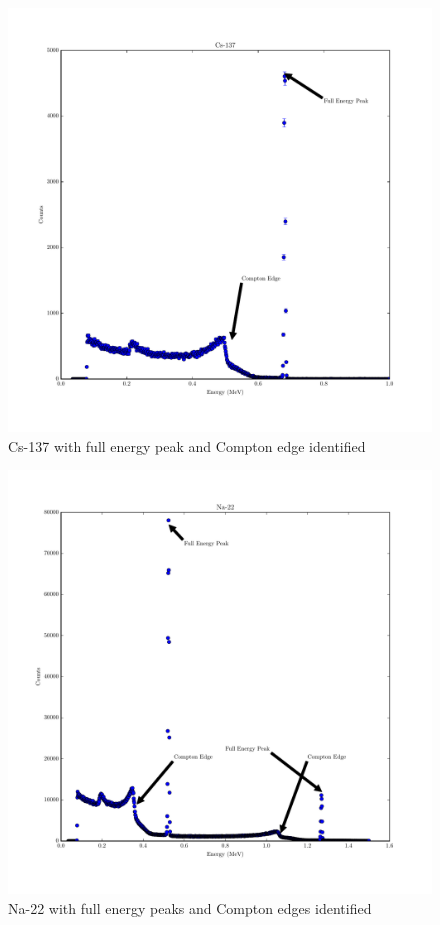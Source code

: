 \documentclass[reprint, nobibnotes, amssymb, amsmath, amsfonts, physics, mathtools, mathrsfs, floatfix]{revtex4-1}
\begin{document}
      \begin{widetext}

        \begin{figure}[h]
          \centering
          \includegraphics[width=\linewidth]{../plots/Cs-137.pdf}
          \caption{Cs-137 with full energy peak and Compton edge identified \label{fig:cs}}
        \end{figure}

        \begin{figure}[h]
          \centering
          \includegraphics[width=\linewidth]{../plots/Na-22.pdf}
          \caption{Na-22 with full energy peaks and Compton edges identified \label{fig:na}}
        \end{figure}


\end{widetext}
\end{document}
